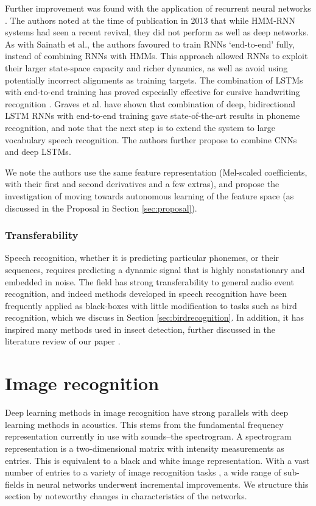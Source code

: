 \documentclass[12pt]{llncs}
\begin{document}
Further improvement was found with the application of recurrent neural networks \cite{graves2013speech}. The authors noted at the time of publication in 2013 that while HMM-RNN systems had seen a recent revival, they did not perform as well as deep networks. As with Sainath et al., the authors favoured to train RNNs ‘end-to-end’ fully, instead of combining RNNs with HMMs. This approach allowed RNNs to exploit their larger state-space capacity and richer dynamics, as well as avoid using potentially incorrect alignments as training targets. The combination of LSTMs with end-to-end training has proved especially effective for cursive handwriting recognition \cite{graves2008unconstrained,graves2009offline}. Graves et al. \cite{graves2013speech} have shown that combination of deep, bidirectional LSTM RNNs with end-to-end training gave state-of-the-art results in phoneme recognition, and note that the next step is to extend the system to large vocabulary speech recognition. The authors further propose to combine CNNs and deep LSTMs. 

We note the authors use the same feature representation (Mel-scaled coefficients, with their first and second derivatives and a few extras), and propose the investigation of moving towards autonomous learning of the feature space (as discussed in the Proposal in Section \ref{sec:proposal}).
\subsubsection{Transferability}
Speech recognition, whether it is predicting particular phonemes, or their sequences, requires predicting a dynamic signal that is highly nonstationary and embedded in noise. The field has strong transferability to general audio event recognition, and indeed methods developed in speech recognition have been frequently applied as black-boxes with little modification to tasks such as bird recognition, which we discuss in Section \ref{sec:birdrecognition}. In addition, it has inspired many methods used in insect detection, further discussed in the literature review of our paper \cite[Section 2.1]{kiskin2017mosquito}.


\section{Image recognition}
\label{sec:imagerecognition}
Deep learning methods in image recognition have strong parallels with deep learning methods in acoustics. This stems from the fundamental frequency representation currently in use with sounds--the spectrogram. A spectrogram representation is a two-dimensional matrix with intensity measurements as entries. This is equivalent to a black and white image representation. With a vast number of entries to a variety of image recognition tasks \cite{russakovsky2014imagenet,ILSVRC15}, a wide range of sub-fields in neural networks underwent incremental improvements. We structure this section by noteworthy changes in characteristics of the networks.
\end{document}

